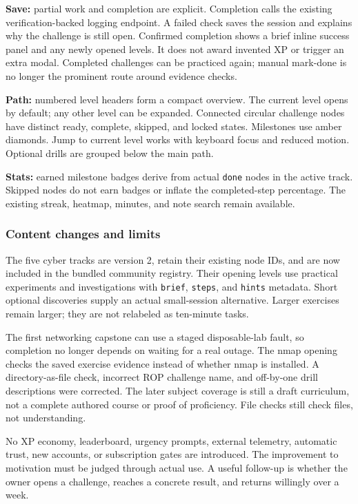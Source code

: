 \textbf{Save:} partial work and completion are explicit. Completion
calls the existing verification-backed logging endpoint. A failed check
saves the session and explains why the challenge is still open.
Confirmed completion shows a brief inline success panel and any newly
opened levels. It does not award invented XP or trigger an extra modal.
Completed challenges can be practiced again; manual mark-done is no
longer the prominent route around evidence checks.

\textbf{Path:} numbered level headers form a compact overview. The
current level opens by default; any other level can be expanded.
Connected circular challenge nodes have distinct ready, complete,
skipped, and locked states. Milestones use amber diamonds. Jump to
current level works with keyboard focus and reduced motion. Optional
drills are grouped below the main path.

\textbf{Stats:} earned milestone badges derive from actual \texttt{done}
nodes in the active track. Skipped nodes do not earn badges or inflate
the completed-step percentage. The existing streak, heatmap, minutes,
and note search remain available.

\hypertarget{content-changes-and-limits}{%
\subsubsection{Content changes and
limits}\label{content-changes-and-limits}}

The five cyber tracks are version 2, retain their existing node IDs, and
are now included in the bundled community registry. Their opening levels
use practical experiments and investigations with \texttt{brief},
\texttt{steps}, and \texttt{hints} metadata. Short optional discoveries
supply an actual small-session alternative. Larger exercises remain
larger; they are not relabeled as ten-minute tasks.

The first networking capstone can use a staged disposable-lab fault, so
completion no longer depends on waiting for a real outage. The nmap
opening checks the saved exercise evidence instead of whether nmap is
installed. A directory-as-file check, incorrect ROP challenge name, and
off-by-one drill descriptions were corrected. The later subject coverage
is still a draft curriculum, not a complete authored course or proof of
proficiency. File checks still check files, not understanding.

No XP economy, leaderboard, urgency prompts, external telemetry,
automatic trust, new accounts, or subscription gates are introduced. The
improvement to motivation must be judged through actual use. A useful
follow-up is whether the owner opens a challenge, reaches a concrete
result, and returns willingly over a week.
